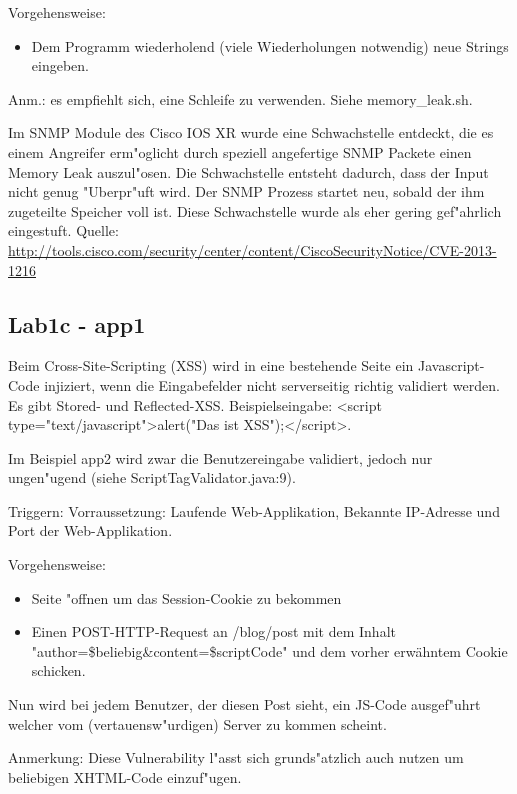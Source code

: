 \documentclass[12pt,a4paper,titlepage,oneside]{scrartcl}
\begin{document}
\begin{description}
Vorgehensweise:
\begin{itemize}
	\item Dem Programm wiederholend (viele Wiederholungen notwendig) neue Strings eingeben.
\end{itemize}
Anm.: es empfiehlt sich, eine Schleife zu verwenden. Siehe memory\_leak.sh.\newline
    
    Im SNMP Module des Cisco IOS XR wurde eine Schwachstelle entdeckt, die es einem Angreifer erm"oglicht durch speziell angefertige SNMP Packete einen Memory Leak auszul"osen. Die Schwachstelle entsteht dadurch, dass der Input nicht genug "Uberpr"uft wird. Der SNMP Prozess startet neu, sobald der ihm zugeteilte Speicher voll ist. Diese Schwachstelle wurde als eher gering gef"ahrlich eingestuft.\newline
    Quelle: \url{http://tools.cisco.com/security/center/content/CiscoSecurityNotice/CVE-2013-1216}
\end{description}

\subsection{Lab1c - app1}
Beim Cross-Site-Scripting (XSS) wird in eine bestehende Seite ein Javascript-Code injiziert, wenn die Eingabefelder nicht serverseitig richtig validiert werden.\newline
Es gibt Stored- und Reflected-XSS.
Beispielseingabe: <script type="text/javascript">alert("Das ist XSS");</script>.

Im Beispiel app2 wird zwar die Benutzereingabe validiert, jedoch nur ungen"ugend (siehe ScriptTagValidator.java:9).

Triggern:
Vorraussetzung: Laufende Web-Applikation, Bekannte IP-Adresse und Port der Web-Applikation.

Vorgehensweise:
\begin{itemize}
	\item Seite "offnen um das Session-Cookie zu bekommen
	\item Einen POST-HTTP-Request an /blog/post mit dem Inhalt "author=\$beliebig\&content=\$scriptCode" und dem vorher erwähntem Cookie schicken.
\end{itemize}

Nun wird bei jedem Benutzer, der diesen Post sieht, ein JS-Code ausgef"uhrt welcher vom (vertauensw"urdigen) Server zu kommen scheint.

Anmerkung: Diese Vulnerability l"asst sich grunds"atzlich auch nutzen um beliebigen XHTML-Code einzuf"ugen.
\end{document}

